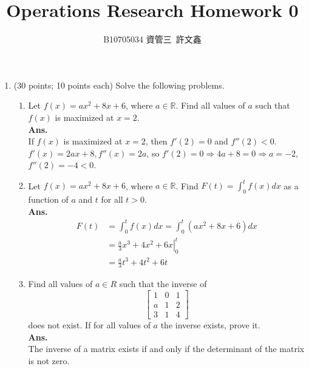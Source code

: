 \documentclass[14pt]{article}
\title{Operations Research Homework 0}
\author{B10705034 資管三\ 許文鑫}
\begin{document}
\maketitle
\begin{enumerate}
    \item (30 points; 10 points each) Solve the following problems.
          \begin{enumerate}
              \item Let $f(x) = ax^2 +8x+6$, where $a \in \mathbb{R} $. Find all values of $a$ such that $f(x)$ is maximized at $x = 2$.\\
                    \textbf{Ans.}\\
                    If $f(x)$ is maximized at $x = 2$, then $f'(2) = 0$ and $f''(2) < 0$.\\
                    $f'(x) = 2ax+8, f''(x) = 2a$, so $f'(2) = 0 \Rightarrow 4a+8 = 0 \Rightarrow a = -2$,\\
                    $f''(2) = -4 < 0$.
              \item Let $f (x) = ax^2 + 8x + 6$, where $a \in \mathbb{R}$. Find $F(t) = \int^t_0f(x)dx$ as a function of $a$ and $t$ for all $t>0$.\\
                    \textbf{Ans. }
                    \begin{align*}
                        F(t) & = \int^t_0f(x)dx = \int^t_0(ax^2 + 8x + 6)dx  \\
                             & = \left.\frac{a}{3}x^3 + 4x^2 + 6x\right|^t_0 \\
                             & = \frac{a}{3}t^3 + 4t^2 + 6t
                    \end{align*}
              \item Find all values of $a \in R$ such that the inverse of
                    \[
                        \begin{bmatrix}
                            1 & 0 & 1 \\
                            a & 1 & 2 \\
                            3 & 1 & 4
                        \end{bmatrix}
                    \]
                    does not exist. If for all values of $a$ the inverse exists, prove it.\\
                    \textbf{Ans. }\\
                    The inverse of a matrix exists if and only if the determinant of the matrix is not zero.\\

\end{enumerate}
\end{enumerate}
\end{document}
